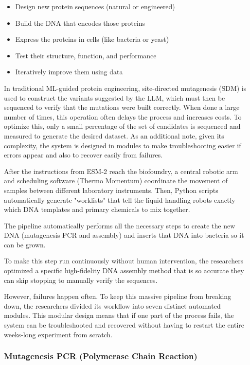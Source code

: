 \documentclass[10pt,a4paper]{article}
\begin{document}
	\begin{itemize}
		\item Design new protein sequences (natural or engineered)
		\item Build the DNA that encodes those proteins
		\item Express the proteins in cells (like bacteria or yeast)
		\item Test their structure, function, and performance
		\item Iteratively improve them using data
	\end{itemize}
	
	In traditional ML-guided protein engineering, site-directed mutagenesis (SDM) is used to construct the variants suggested by the LLM, which must then be sequenced to verify that the mutations were built correctly. When done a large number of times, this operation often delays the process and increases costs. To optimize this, only a small percentage of the set of candidates is sequenced and measured to generate the desired dataset. As an additional note, given its complexity, the system is designed in modules to make troubleshooting easier if errors appear and also to recover easily from failures.
	
	After the instructions from ESM-2 reach the biofoundry, a central robotic arm and scheduling software (Thermo Momentum) coordinate the movement of samples between different laboratory instruments. Then, Python scripts automatically generate "worklists" that tell the liquid-handling robots exactly which DNA templates and primary chemicals to mix together.
	
	The pipeline automatically performs all the necessary steps to create the new DNA (mutagenesis PCR and assembly) and inserts that DNA into bacteria so it can be grown.
	
	To make this step run continuously without human intervention, the researchers optimized a specific high-fidelity DNA assembly method that is so accurate they can skip stopping to manually verify the sequences.
	
	However, failures happen often. To keep this massive pipeline from breaking down, the researchers divided its workflow into seven distinct automated modules. This modular design means that if one part of the process fails, the system can be troubleshooted and recovered without having to restart the entire weeks-long experiment from scratch.
	
	\subsubsection{Mutagenesis PCR (Polymerase Chain Reaction)}
	
\end{document}
